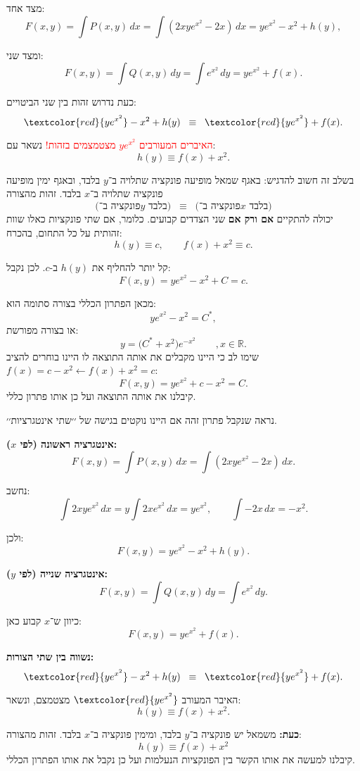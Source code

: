 \documentclass{article}
\numberwithin{equation}{section}
\begin{document}
מצד אחד:
\[
F(x,y) = \int P(x,y)\,dx = \int (2xye^{x^2}-2x)\,dx = ye^{x^2} - x^2 + h(y),
\]

ומצד שני:
\[
F(x,y) = \int Q(x,y)\,dy = \int e^{x^2}\,dy = ye^{x^2} + f(x).
\]

כעת נדרוש זהות בין שני הביטויים:
\[
\textcolor{red}{ye^{x^2}} - x^2 + h(y) \;\;\equiv\;\; \textcolor{red}{ye^{x^2}} + f(x).
\]

\textcolor{red}{האיברים המעורבים $ye^{x^2}$ מצטמצמים בזהות!} 
נשאר עם:
\[
h(y) \equiv f(x) + x^2.
\]

בשלב זה חשוב להדגיש: 
באגף שמאל מופיעה פונקציה שתלויה ב־$y$ בלבד, ובאגף ימין מופיעה פונקציה שתלויה ב־$x$ בלבד. 
זהות מהצורה
\[
\text{(פונקציה ב־$y$ בלבד)} \;\;\equiv\;\; \text{(פונקציה ב־$x$ בלבד)}
\]
יכולה להתקיים \textbf{אם ורק אם} שני הצדדים קבועים.  
כלומר, אם שתי פונקציות כאלו שוות זהותית על כל התחום, בהכרח:
\[
h(y) \equiv c, 
\qquad 
f(x) + x^2 \equiv c.
\]

קל יותר להחליף את $h(y)$ ב-$c$. לכן נקבל:
\[
F(x,y) = ye^{x^2} - x^2 + C = c.
\]

מכאן הפתרון הכללי בצורה סתומה הוא:
\[
ye^{x^2} - x^2 = C^*,
\]
או בצורה מפורשת:
\[
y = \big(C^* + x^2\big)e^{-x^2}\qquad , x\in\mathbb{R}.
\]
שימו לב כי היינו מקבלים את אותה התוצאה לו היינו בוחרים להציב 
$f(x)=c-x^{2}
\leftarrow 
f(x) + x^2 = c$:
\[
F(x,y) = ye^{x^2} + c-x^{2} = C.
\]
קיבלנו את אותה התוצאה ועל כן אותו פתרון כללי.

נראה שנקבל פתרון זהה אם היינו נוקטים בגישה של ׳׳שתי אינטגרציות׳׳.

\textbf{אינטגרציה ראשונה (לפי $x$):}
\[
F(x,y) = \int P(x,y)\,dx = \int (2xye^{x^2}-2x)\,dx.
\]

נחשב:
\[
\int 2xye^{x^2}\,dx = y\int 2xe^{x^2}\,dx = ye^{x^2}, 
\qquad 
\int -2x\,dx = -x^2.
\]

ולכן:
\[
F(x,y) = ye^{x^2} - x^2 + h(y).
\]

\textbf{אינטגרציה שנייה (לפי $y$):}
\[
F(x,y) = \int Q(x,y)\,dy = \int e^{x^2}\,dy.
\]

כיוון ש־$x$ קבוע כאן:
\[
F(x,y) = ye^{x^2} + f(x).
\]

\textbf{נשווה בין שתי הצורות:}
\[
\textcolor{red}{ye^{x^2}} - x^2 + h(y) \;\;\equiv\;\; \textcolor{red}{ye^{x^2}} + f(x).
\]

האיבר המעורב $\textcolor{red}{ye^{x^2}}$ מצטמצם, ונשאר:
\[
h(y) \equiv f(x) + x^2.
\]

\textbf{כעת:}  
משמאל יש פונקציה ב־$y$ בלבד, ומימין פונקציה ב־$x$ בלבד. זהות מהצורה:
\[
h(y) \equiv f(x) + x^2
\]
קיבלנו למעשה את אותו הקשר בין הפונקציות הנעלמות ועל כן נקבל את אותו הפתרון הכללי.
\end{document}
